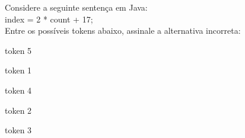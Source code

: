 \question[10]

Considere a seguinte sentença em Java:\\
index = 2 * count + 17;\\
Entre os possíveis tokens abaixo, assinale a alternativa incorreta:\\
\begin{choices}
\item token 5 %
\item token 1 
\item token 4
\item token 2
\item token 3 
\end{choices}
\answerline

